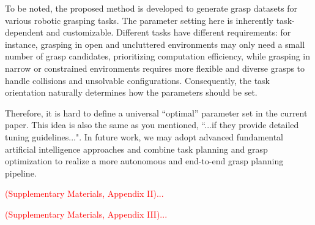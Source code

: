 \documentclass[journal]{IEEEtran}
\newcommand{\rev}[1]{\textcolor{red}{#1}}
\begin{document}
To be noted, the proposed method is developed to generate grasp datasets for various robotic grasping tasks. The parameter setting here is inherently task-dependent and customizable. Different tasks have different requirements: for instance, grasping in open and uncluttered environments may only need a small number of grasp candidates, prioritizing computation efficiency, while grasping in narrow or constrained environments requires more flexible and diverse grasps to handle collisions and unsolvable configurations. Consequently, the task orientation naturally determines how the parameters should be set.

Therefore, it is hard to define a universal ``optimal” parameter set in the current paper. This idea is also the same as you mentioned, ``...if they provide detailed tuning guidelines...". In future work, we may adopt advanced fundamental artificial intelligence approaches and combine task planning and grasp optimization to realize a more autonomous and end-to-end grasp planning pipeline.

\rev{(Supplementary Materials, Appendix II)...}

\rev{(Supplementary Materials, Appendix III)...}
\\
\end{document}
